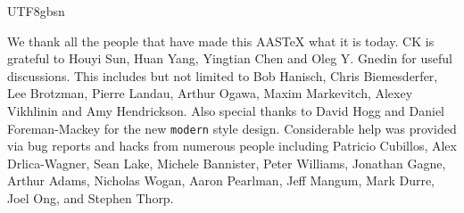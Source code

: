 \documentclass[trackchanges, twocolappendix, twocolumn]{aastex701}
\begin{document}
\begin{CJK*}{UTF8}{gbsn}
\begin{acknowledgments}
We thank all the people that have made this AASTeX what it is today. CK is grateful to Houyi Sun, Huan Yang, Yingtian Chen and Oleg Y. Gnedin for useful discussions. This
includes but not limited to Bob Hanisch, Chris Biemesderfer, Lee Brotzman,
Pierre Landau, Arthur Ogawa, Maxim Markevitch, Alexey Vikhlinin and Amy
Hendrickson. Also special thanks to David Hogg and Daniel Foreman-Mackey
for the new {\tt\string modern} style design. Considerable help was provided via bug
reports and hacks from numerous people including Patricio Cubillos, Alex
Drlica-Wagner, Sean Lake, Michele Bannister, Peter Williams, Jonathan
Gagne, Arthur Adams, Nicholas Wogan, Aaron Pearlman, Jeff Mangum, Mark Durre, Joel Ong, and Stephen Thorp.
\end{acknowledgments}





%


\end{CJK*}
\end{document}
